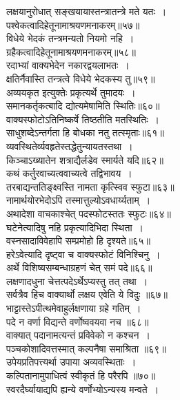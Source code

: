 {{{{\begin{center}
 लक्षयानुरोधात् सङ्खयायास्तन्त्रातन्त्रे मते यतः~।\\
 पश्वेकत्वादिहेतूनामाश्रयणमनाकरम्॥५७॥\\[10pt]
 विधेये भेदकं तन्त्रमन्यतो नियमो नहि~।\\
 ग्रहैकत्वादिहेतूनामाश्रयणमनाकरम्॥५८॥\\[10pt]
 रदाभ्यां वाक्यभेदेन नकारद्वयलाभतः~।\\
 क्षतिर्नैवास्ति तन्त्रत्वे विधेये भेदकस्य तु॥५९॥\\[10pt]
 अव्ययकृत इत्युक्तेः प्रकृत्यर्थे तुमादयः~।\\
 समानकर्तृकत्बादि द्योत्यमेषामिति स्थितिः॥६०॥\\[10pt]
 वाक्यस्फोटोऽतिनिष्कर्षे तिष्ठतीति मतस्थितिः~।\\
 साधुशब्देऽन्तर्गता हि बोधका नतु तत्स्मृताः॥६१॥\\[10pt]
 व्यवस्थितेर्व्यवहृतेस्तद्धेतुन्यायतस्तथा~।\\
 किञ्चाऽख्यातेन शत्राद्यैर्लडेव स्मार्यते यदि॥६२॥\\[10pt]
 कथं कर्तुरवाच्यत्ववाच्यत्वे तद्विभावय~।\\
 तरबाद्यन्ततिङ्क्ष्वस्ति नामता कृत्स्विव स्फुटा॥६३॥\\[10pt]
 नामार्थयोरभेदोऽपि तस्मात्तुल्योऽवधार्य्यताम्~।\\
 अथादेशा वाचकाश्चेत् पदस्फोटस्ततः स्फुटः॥६४॥\\[10pt]
 घटेनेत्यादिषु नहि प्रकृत्यादिभिदा स्थिता~।\\
 वस्नसादाविवेहापि सम्प्रमोहो हि दृश्यते॥६५॥\\[10pt]
 हरेऽवेत्यादि दृष्ट्वा च वाक्यस्फोटं विनिश्चिनु~।\\
 अर्थे विशिष्यसम्बन्धाग्रहणं चेत् समं पदे॥६६॥\\[10pt]
 लक्षणादधुना चेत्तत्पदेऽर्थेऽप्यस्तु तत् तथा~।\\
 सर्वत्रैव हिच वाक्यार्थो लक्षय एवेति ये विदुः ॥६७॥\\[10pt]
 भाट्टास्तेऽपीत्थमेवाहुर्लक्षणाया ग्रहे गतिम्~।\\
 पदे न वर्णा विद्यन्ते वर्णोष्ववयवा नच ॥६८॥\\[10pt]
 वाक्यात् पदानामत्यन्तं प्रविवेको न कश्चन~।\\
 पञ्चकोशादिवत्तस्मात् कल्पनैषा समाश्रिता ॥६९॥\\[10pt]
 उपेयप्रतिपत्त्यर्था उपाया अव्यवस्थिताः~।\\
 कल्पितानामुपाधित्वं स्वीकृतं हि परैरपि ॥७०॥\\[10pt]
 स्वरदैर्घ्यायाद्यपि ह्यन्ये वर्णोभ्योऽन्यस्य मन्वते~।\\

\end{center}}}}}
